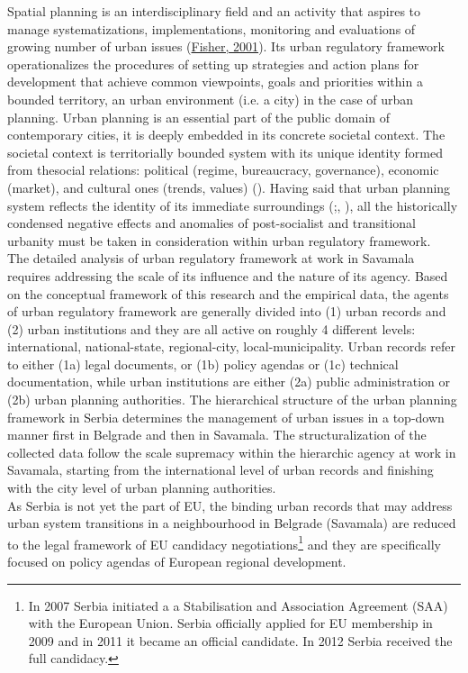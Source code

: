 \documentclass[11pt]{report}
\begin{document}
Spatial planning is an interdisciplinary field and an activity that aspires to manage systematizations, implementations, monitoring and evaluations of growing number of urban issues (\href{ref}{Fisher, 2001}). Its urban regulatory framework operationalizes the procedures of setting up strategies and action plans for development that achieve common viewpoints, goals and priorities within a bounded territory, an urban environment (i.e. a city) in the case of urban planning.
Urban planning is an essential part of the public domain of contemporary cities, it is deeply embedded in its concrete societal context.
The societal context is territorially bounded system with its unique identity formed from thesocial relations:
political (regime, bureaucracy, governance),
economic (market), and
cultural ones (trends, values) (\href{ref}{\citealt{vujosevic_planning_2006}}).
Having said that urban planning system reflects the identity of its immediate surroundings (\cite{Stojkov and Dobricic 2012};, \cite{Arbter 2001}), all the historically condensed negative effects and anomalies of post-socialist and transitional urbanity must be taken in consideration within urban regulatory framework.
\\
The detailed analysis of urban regulatory framework at work in Savamala requires addressing the scale of its influence and the nature of its agency.
Based on the conceptual framework of this research and the empirical data, the agents of urban regulatory framework are generally divided into  (1) urban records and (2) urban institutions and they are all active on roughly 4 different levels: international, national-state, regional-city, local-municipality.
Urban records refer to either (1a) legal documents, or (1b) policy agendas or (1c) technical documentation, while urban institutions are either (2a) public administration or (2b) urban planning authorities.
The hierarchical structure of the urban planning framework in Serbia determines the management of urban issues in a top-down manner first in Belgrade and then in Savamala.
The structuralization of the collected data follow the scale supremacy within the hierarchic agency at work in Savamala, starting from the international level of urban records and finishing with the city level of urban planning authorities.
\\
As Serbia is not yet the part of EU, the binding urban records that may address urban system transitions in a neighbourhood in Belgrade (Savamala) are reduced to the legal framework of EU candidacy negotiations\footnote{In 2007 Serbia initiated a a Stabilisation and Association Agreement (SAA) with the European Union. Serbia officially applied for EU membership in 2009 and in 2011 it became an official candidate. In 2012 Serbia received the full candidacy.}
and they are specifically focused on policy agendas of European regional development.
\end{document}
